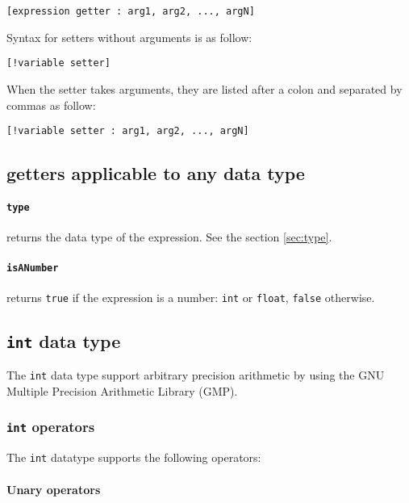 \documentclass[11pt]{article}
\begin{document}
\begin{lstlisting}[language=goilTemplate]
[expression getter : arg1, arg2, ..., argN]
\end{lstlisting}

Syntax for setters without arguments is as follow:

\begin{lstlisting}[language=goilTemplate]
[!variable setter]
\end{lstlisting}

When the setter takes arguments, they are listed after a colon and separated by commas as follow:

\begin{lstlisting}[language=goilTemplate]
[!variable setter : arg1, arg2, ..., argN]
\end{lstlisting}

\subsection{getters applicable to any data type}

\paragraph{\lstinline{type}} returns the data type of the expression. See the section \ref{sec:type}.

\paragraph{\lstinline{isANumber}} returns \lstinline{true} if the expression is a number: \lstinline{int} or \lstinline{float}, \lstinline{false} otherwise.

\subsection{\lstinline{int} data type}

The \lstinline{int} data type support arbitrary precision arithmetic by using the GNU Multiple Precision Arithmetic Library (GMP).

\subsubsection{\lstinline{int} operators}

The \lstinline{int} datatype supports the following operators:

\paragraph{Unary operators}~
\end{document}
